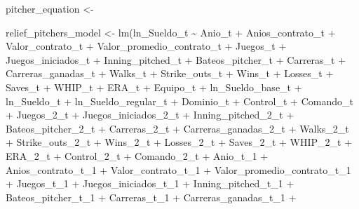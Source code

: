 \documentclass[
]{article}
\newenvironment{Shaded}{\begin{snugshade}}{\end{snugshade}}
\newcommand{\FunctionTok}[1]{\textcolor[rgb]{0.00,0.00,0.00}{#1}}
\newcommand{\NormalTok}[1]{#1}
\newcommand{\OtherTok}[1]{\textcolor[rgb]{0.56,0.35,0.01}{#1}}
\newcommand{\SpecialCharTok}[1]{\textcolor[rgb]{0.00,0.00,0.00}{#1}}
\begin{document}
\begin{Shaded}
\begin{Highlighting}[]
\NormalTok{pitcher\_equation }\OtherTok{\textless{}{-}} 

\NormalTok{relief\_pitchers\_model }\OtherTok{\textless{}{-}} \FunctionTok{lm}\NormalTok{(ln\_Sueldo\_t }\SpecialCharTok{\textasciitilde{}}\NormalTok{ Anio\_t }\SpecialCharTok{+}\NormalTok{ Anios\_contrato\_t }\SpecialCharTok{+}\NormalTok{ Valor\_contrato\_t }\SpecialCharTok{+}\NormalTok{ Valor\_promedio\_contrato\_t }\SpecialCharTok{+} 
\NormalTok{Juegos\_t }\SpecialCharTok{+}\NormalTok{ Juegos\_iniciados\_t }\SpecialCharTok{+}\NormalTok{ Inning\_pitched\_t }\SpecialCharTok{+}\NormalTok{ Bateos\_pitcher\_t }\SpecialCharTok{+}\NormalTok{ Carreras\_t }\SpecialCharTok{+}       
\NormalTok{Carreras\_ganadas\_t }\SpecialCharTok{+}\NormalTok{  Walks\_t }\SpecialCharTok{+}\NormalTok{ Strike\_outs\_t }\SpecialCharTok{+}\NormalTok{  Wins\_t }\SpecialCharTok{+}\NormalTok{ Losses\_t  }\SpecialCharTok{+}\NormalTok{ Saves\_t }\SpecialCharTok{+}\NormalTok{ WHIP\_t }\SpecialCharTok{+} 
\NormalTok{ERA\_t }\SpecialCharTok{+}\NormalTok{ Equipo\_t }\SpecialCharTok{+}\NormalTok{ ln\_Sueldo\_base\_t }\SpecialCharTok{+}\NormalTok{ ln\_Sueldo\_t }\SpecialCharTok{+}\NormalTok{ ln\_Sueldo\_regular\_t  }\SpecialCharTok{+}\NormalTok{ Dominio\_t }\SpecialCharTok{+}\NormalTok{ Control\_t }\SpecialCharTok{+}\NormalTok{ Comando\_t }\SpecialCharTok{+}           
\NormalTok{Juegos\_2\_t }\SpecialCharTok{+}\NormalTok{ Juegos\_iniciados\_2\_t }\SpecialCharTok{+}\NormalTok{ Inning\_pitched\_2\_t }\SpecialCharTok{+}\NormalTok{ Bateos\_pitcher\_2\_t }\SpecialCharTok{+}\NormalTok{ Carreras\_2\_t }\SpecialCharTok{+}    
\NormalTok{Carreras\_ganadas\_2\_t }\SpecialCharTok{+}\NormalTok{ Walks\_2\_t }\SpecialCharTok{+}\NormalTok{ Strike\_outs\_2\_t  }\SpecialCharTok{+}\NormalTok{ Wins\_2\_t }\SpecialCharTok{+}\NormalTok{ Losses\_2\_t  }\SpecialCharTok{+}\NormalTok{ Saves\_2\_t }\SpecialCharTok{+}\NormalTok{ WHIP\_2\_t  }\SpecialCharTok{+}
\NormalTok{ERA\_2\_t }\SpecialCharTok{+}\NormalTok{ Control\_2\_t }\SpecialCharTok{+}\NormalTok{ Comando\_2\_t }\SpecialCharTok{+}\NormalTok{ Anio\_t\_1 }\SpecialCharTok{+}\NormalTok{ Anios\_contrato\_t\_1 }\SpecialCharTok{+}\NormalTok{ Valor\_contrato\_t\_1 }\SpecialCharTok{+}\NormalTok{ Valor\_promedio\_contrato\_t\_1 }\SpecialCharTok{+} 
\NormalTok{Juegos\_t\_1 }\SpecialCharTok{+}\NormalTok{ Juegos\_iniciados\_t\_1  }\SpecialCharTok{+}\NormalTok{ Inning\_pitched\_t\_1 }\SpecialCharTok{+}\NormalTok{ Bateos\_pitcher\_t\_1 }\SpecialCharTok{+}\NormalTok{ Carreras\_t\_1 }\SpecialCharTok{+}\NormalTok{ Carreras\_ganadas\_t\_1  }\SpecialCharTok{+}   

\end{Highlighting}
\end{Shaded}
\end{document}
